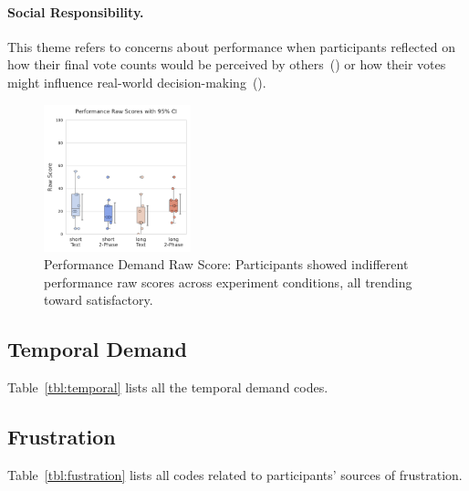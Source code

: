 \paragraph{Social Responsibility.} This theme refers to concerns about performance when participants reflected on how their final vote counts would be perceived by others~() or how their votes might influence real-world decision-making~().

\begin{figure}[h]
    \centering
    \includegraphics[width=0.38\textwidth, trim=0 13 0 13, clip]{content/image/cog/Performance_scores.pdf}
    \captionsetup{width=0.9\linewidth, justification=justified}
    \caption{Performance Demand Raw Score: Participants showed indifferent performance raw scores across experiment conditions, all trending toward satisfactory.}
    \label{fig:performance_cog_score}
\end{figure}

\subsection{Temporal Demand}
\label{apdx:temporal}
Table~\ref{tbl:temporal} lists all the temporal demand codes.


\subsection{Frustration}
\label{apdx:frus}
Table~\ref{tbl:fustration} lists all codes related to participants' sources of frustration.


